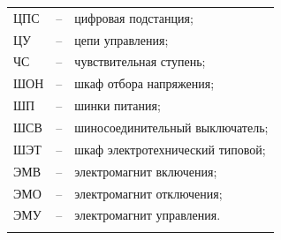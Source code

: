\begin{longtable}{>{\raggedright\arraybackslash}m{2cm}>{\raggedright\arraybackslash}m{0.5cm}>{\raggedright\arraybackslash}m{20cm}}
ЦПС & -- & цифровая подстанция; \\
ЦУ & -- & цепи управления; \\
ЧС & -- & чувствительная ступень; \\
ШОН & -- & шкаф отбора напряжения; \\
ШП & -- & шинки питания; \\
ШСВ & -- & шиносоединительный выключатель; \\
ШЭТ & -- & шкаф электротехнический типовой; \\
ЭМВ & -- & электромагнит включения; \\
ЭМО & -- & электромагнит отключения; \\
ЭМУ & -- & электромагнит управления. \\
{\color{white}\fontsize{0.1pt}{0.1pt}\selectfont<endABBRS>}
\end{longtable}
